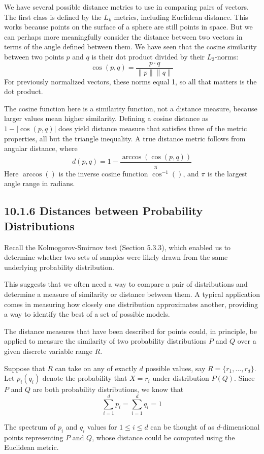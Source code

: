 \documentclass[10pt]{article}
\begin{document}
We have several possible distance metrics to use in comparing pairs of vectors. The first class is defined by the $L_k$ metrics, including Euclidean distance. This works because points on the surface of a sphere are still points in space. But we can perhaps more meaningfully consider the distance between two vectors in terms of the angle defined between them. We have seen that the cosine similarity between two points $p$ and $q$ is their dot product divided by their $L_2$-norms:
\[
\cos(p, q)=\frac{p \cdot q}{\|p\|\|q\|}
\]
For previously normalized vectors, these norms equal 1, so all that matters is the dot product.

The cosine function here is a similarity function, not a distance measure, because larger values mean higher similarity. Defining a cosine distance as $1-|\cos(p, q)|$ does yield distance measure that satisfies three of the metric properties, all but the triangle inequality. A true distance metric follows from angular distance, where
\[
d(p, q)=1-\frac{\arccos (\cos (p, q))}{\pi}
\]
Here $\arccos ()$ is the inverse cosine function $\cos^{-1}()$, and $\pi$ is the largest angle range in radians.

\subsection*{10.1.6 Distances between Probability Distributions}
Recall the Kolmogorov-Smirnov test (Section 5.3.3), which enabled us to determine whether two sets of samples were likely drawn from the same underlying probability distribution.

This suggests that we often need a way to compare a pair of distributions and determine a measure of similarity or distance between them. A typical application comes in measuring how closely one distribution approximates another, providing a way to identify the best of a set of possible models.

The distance measures that have been described for points could, in principle, be applied to measure the similarity of two probability distributions $P$ and $Q$ over a given discrete variable range $R$.

Suppose that $R$ can take on any of exactly $d$ possible values, say $R=\{r_1, \ldots, r_d\}$. Let $p_i(q_i)$ denote the probability that $X=r_i$ under distribution $P(Q)$. Since $P$ and $Q$ are both probability distributions, we know that
\[
\sum_{i=1}^{d} p_i = \sum_{i=1}^{d} q_i = 1
\]

The spectrum of $p_i$ and $q_i$ values for $1 \leq i \leq d$ can be thought of as $d$-dimensional points representing $P$ and $Q$, whose distance could be computed using the Euclidean metric.
\end{document}
